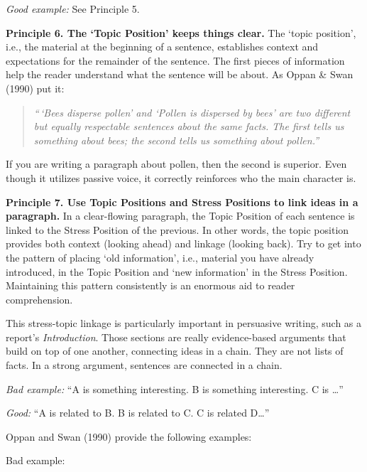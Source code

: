 \documentclass[]{book}
\begin{document}
\emph{Good example:} See Principle 5.

\textbf{Principle 6. The `Topic Position' keeps things clear.} The `topic position', i.e., the material at the beginning of a sentence, establishes context and expectations for the remainder of the sentence. The first pieces of information help the reader understand what the sentence will be about. As Oppan \& Swan (1990) put it:

\begin{quote}
\emph{``\,`Bees disperse pollen' and `Pollen is dispersed by bees' are two different but equally respectable sentences about the same facts. The first tells us something about bees; the second tells us something about pollen.''}
\end{quote}

If you are writing a paragraph about pollen, then the second is superior. Even though it utilizes passive voice, it correctly reinforces who the main character is.

\textbf{Principle 7. Use Topic Positions and Stress Positions to link ideas in a paragraph.} In a clear-flowing paragraph, the Topic Position of each sentence is linked to the Stress Position of the previous. In other words, the topic position provides both context (looking ahead) and linkage (looking back). Try to get into the pattern of placing `old information', i.e., material you have already introduced, in the Topic Position and `new information' in the Stress Position. Maintaining this pattern consistently is an enormous aid to reader comprehension.

This stress-topic linkage is particularly important in persuasive writing, such as a report's \emph{Introduction}. Those sections are really evidence-based arguments that build on top of one another, connecting ideas in a chain. They are not lists of facts.
In a strong argument, sentences are connected in a chain.

\emph{Bad example:} ``A is something interesting. B is something interesting. C is \ldots{}''

\emph{Good:} ``A is related to B. B is related to C. C is related D\ldots{}''

Oppan and Swan (1990) provide the following examples:

Bad example:
\end{document}
